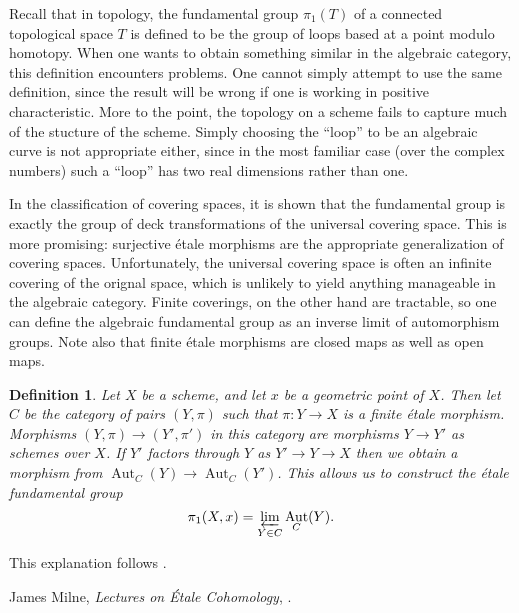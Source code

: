 \documentclass[12pt]{article}
\newtheorem{defn}{Definition}
\DeclareMathOperator{\Aut}{Aut}
\begin{document}
Recall that in topology, the fundamental group $\pi_1(T)$ of a connected topological space $T$ is defined to be the group of loops based at a point modulo homotopy.  When one wants to obtain something similar in the algebraic category, this definition encounters problems.  One cannot simply attempt to use the same definition, since the result will be wrong if one is working in positive characteristic.  More to the point, the topology on a scheme fails to capture much of the stucture of the scheme.  Simply choosing the ``loop'' to be an algebraic curve is not appropriate either, since in the most familiar case (over the complex numbers) such a ``loop'' has two real dimensions rather than one. 

In the classification of covering spaces, it is shown that the fundamental group is exactly the group of deck transformations of the universal covering space.  This is more promising: surjective \'etale morphisms are the appropriate generalization of covering spaces.  Unfortunately, the universal covering space is often an infinite covering of the orignal space, which is unlikely to yield anything manageable in the algebraic category.  Finite coverings, on the other hand are tractable, so one can define the algebraic fundamental group as an inverse limit of automorphism groups.  Note also that finite \'etale morphisms are closed maps as well as open maps.

\begin{defn}
Let $X$ be a scheme, and let $x$ be a geometric point of $X$.  Then let $C$ be the category of pairs $(Y,\pi)$ such that $\pi\colon Y \to X$ is a finite \'etale morphism.  Morphisms $(Y,\pi)\to (Y',\pi')$ in this category are morphisms $Y\to Y'$ as schemes over $X$.  If $Y'$ factors through $Y$ as $Y'\to Y\to X$ then we obtain a morphism from $\Aut_C(Y)\to\Aut_C(Y')$.  This allows us to construct the \emph{\'etale fundamental group}
\[
\pi_1(X,x) = \varprojlim_{Y\in C} \Aut_C(Y).
\]
\end{defn}

This explanation follows \cite{milne}.
\begin{thebibliography}{9}
 James Milne, {\em Lectures on \'Etale Cohomology}, .
\end{thebibliography}
\end{document}
